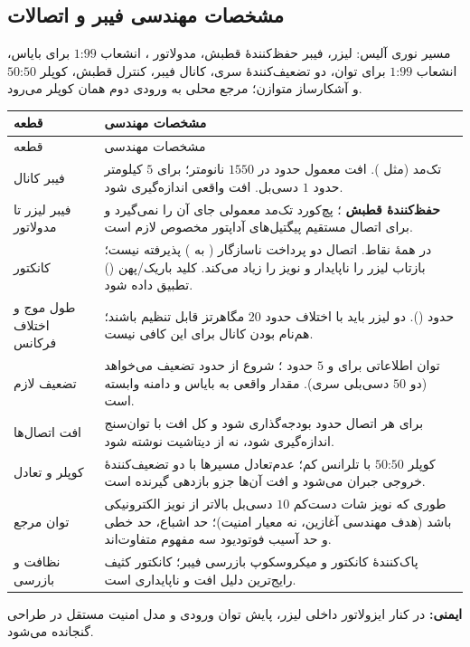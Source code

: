\subsection{مشخصات مهندسی فیبر و اتصالات}
مسیر نوری آلیس: لیزر، فیبر حفظ‌کنندهٔ قطبش، مدولاتور ، انشعاب $99$:$1$ برای بایاس، انشعاب $99$:$1$ برای توان، دو تضعیف‌کنندهٔ سری، کانال فیبر، کنترل قطبش، کوپلر $50$:$50$ و آشکارساز متوازن؛ مرجع محلی به ورودی دوم همان کوپلر می‌رود.
\begin{longtable}{R{3.6cm}R{11.2cm}}
\toprule {} قطعه & مشخصات مهندسی \\ \midrule
\endfirsthead
\toprule {} قطعه & مشخصات مهندسی \\ \midrule
\endhead
فیبر کانال & تک‌مد  (مثل ). افت معمول حدود  در $1550$ نانومتر؛ برای $5$ کیلومتر حدود $1$ دسی‌بل\verify{}. افت واقعی اندازه‌گیری شود. \\
فیبر لیزر تا مدولاتور & \textbf{حفظ‌کنندهٔ قطبش }؛ پچ‌کورد تک‌مد معمولی جای آن را نمی‌گیرد و برای اتصال مستقیم پیگتیل‌های  آداپتور مخصوص لازم است. \\
کانکتور &  در همهٔ نقاط. اتصال دو پرداخت ناسازگار ( به ) پذیرفته نیست؛ بازتاب لیزر را ناپایدار و نویز را زیاد می‌کند. کلید باریک/پهن () تطبیق داده شود. \\
طول موج و اختلاف فرکانس & حدود  (). دو لیزر باید با اختلاف حدود $20$ مگاهرتز قابل تنظیم باشند؛ هم‌نام بودن کانال برای این کافی نیست. \\
تضعیف لازم & توان اطلاعاتی برای  و $5$  حدود ؛ شروع از  حدود  تضعیف می‌خواهد (دو  $50$ دسی‌بلی سری). مقدار واقعی به بایاس و دامنه وابسته است. \\
افت اتصال‌ها & برای هر اتصال حدود  بودجه‌گذاری شود\verify{} و کل افت با توان‌سنج اندازه‌گیری شود، نه از دیتاشیت نوشته شود. \\
کوپلر و تعادل & کوپلر $50$:$50$ با تلرانس کم؛ عدم‌تعادل مسیرها با دو تضعیف‌کنندهٔ خروجی جبران می‌شود و افت آن‌ها جزو بازدهی گیرنده است. \\
توان مرجع & طوری که نویز شات دست‌کم $10$ دسی‌بل بالاتر از نویز الکترونیکی باشد (هدف مهندسی آغازین، نه معیار امنیت)؛ حد اشباع، حد خطی و حد آسیب فوتودیود سه مفهوم متفاوت‌اند. \\
نظافت و بازرسی & پاک‌کنندهٔ کانکتور و میکروسکوپ بازرسی فیبر؛ کانکتور کثیف رایج‌ترین دلیل افت و ناپایداری است. \\
\bottomrule\end{longtable}
\textbf{ایمنی:} در کنار ایزولاتور داخلی لیزر، پایش توان ورودی و مدل امنیت مستقل در طراحی گنجانده می‌شود\cite{cvreport}.

